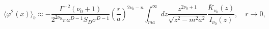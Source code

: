 \begin{equation}\label{limitrto0}
\langle \varphi ^{2}(x)\rangle _{b}\approx -\frac{\Gamma ^{-2}(\nu
_0+1)}{2^{2\nu _0}\pi a ^{D-1}S_D\sigma ^{D-1}}\left(
\frac{r}{a}\right) ^{2\nu _0-n}\int _{ma}^{\infty }dz
\frac{z^{2\nu _0+1}}{\sqrt{z^2-m^2a^2}}\frac{\bar K_{\nu
_0}(z)}{\bar I_{\nu _0}(z)},\quad r\to 0,
\end{equation}

